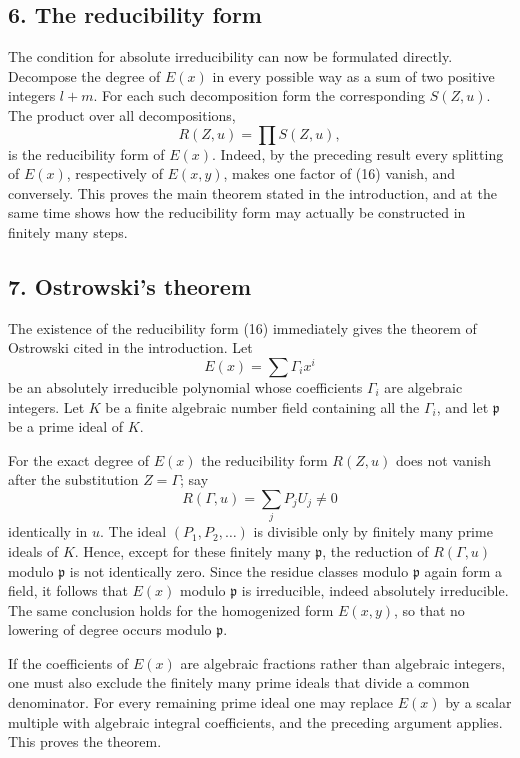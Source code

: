 \documentclass[12pt]{article}
\begin{document}
\subsection*{6. The reducibility form}

The condition for absolute irreducibility can now be formulated directly. Decompose the degree of $E(x)$ in every possible way as a sum of two positive integers $l+m$. For each such decomposition form the corresponding $S(Z,u)$. The product over all decompositions,
\begin{equation}
  R(Z,u)=\prod S(Z,u),                                            \tag{16}
\end{equation}
is the reducibility form of $E(x)$. Indeed, by the preceding result every splitting of $E(x)$, respectively of $E(x,y)$, makes one factor of (16) vanish, and conversely. This proves the main theorem stated in the introduction, and at the same time shows how the reducibility form may actually be constructed in finitely many steps.

\subsection*{7. Ostrowski's theorem}

The existence of the reducibility form (16) immediately gives the theorem of Ostrowski cited in the introduction. Let
\[
  E(x)=\sum \Gamma_i x^i
\]
be an absolutely irreducible polynomial whose coefficients $\Gamma_i$ are algebraic integers. Let $K$ be a finite algebraic number field containing all the $\Gamma_i$, and let $\mathfrak p$ be a prime ideal of $K$.

For the exact degree of $E(x)$ the reducibility form $R(Z,u)$ does not vanish after the substitution $Z=\Gamma$; say
\[
  R(\Gamma,u)=\sum_j P_j U_j\ne 0
\]
identically in $u$. The ideal $(P_1,P_2,\ldots)$ is divisible only by finitely many prime ideals of $K$. Hence, except for these finitely many $\mathfrak p$, the reduction of $R(\Gamma,u)$ modulo $\mathfrak p$ is not identically zero. Since the residue classes modulo $\mathfrak p$ again form a field, it follows that $E(x)$ modulo $\mathfrak p$ is irreducible, indeed absolutely irreducible. The same conclusion holds for the homogenized form $E(x,y)$, so that no lowering of degree occurs modulo $\mathfrak p$.

If the coefficients of $E(x)$ are algebraic fractions rather than algebraic integers, one must also exclude the finitely many prime ideals that divide a common denominator. For every remaining prime ideal one may replace $E(x)$ by a scalar multiple with algebraic integral coefficients, and the preceding argument applies. This proves the theorem.
\end{document}
